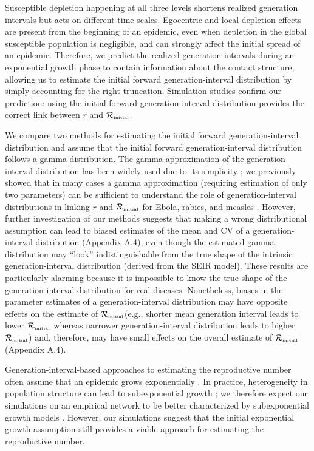 \documentclass[12pt]{article}
\newcommand{\Rx}[1]{\ensuremath{{\mathcal R}_{#1}}\xspace}
\newcommand{\Rini}{\Rx{\textrm{\tiny initial}}}
\begin{document}
Susceptible depletion happening at all three levels shortens realized generation intervals but acts on different time scales.
Egocentric and local depletion effects are present from the beginning of an epidemic, even when depletion in the global susceptible population is negligible, and can strongly affect the initial spread of an epidemic.
Therefore, we predict the realized generation intervals during an exponential growth phase to contain information about the contact structure, allowing us to estimate the initial forward generation-interval distribution by simply accounting for the right truncation.
Simulation studies confirm our prediction: using the initial forward generation-interval distribution provides the correct link between $r$ and $\Rini$.

We compare two methods for estimating the initial forward generation-interval distribution and assume that the initial forward generation-interval distribution follows a gamma distribution.
The gamma approximation of the generation interval distribution has been widely used due to its simplicity \citep{mcbryde2009early, nishiura2009transmission, roberts2011early, trichereau2012estimation, nishiura2015theoretical};
we previously showed that in many cases a gamma approximation (requiring estimation of only two parameters) can be sufficient to understand the role of generation-interval distributions in linking $r$ and $\Rini$ for Ebola, rabies, and measles \citep{park2019practical}.
However, further investigation of our methods suggests that making a wrong distributional assumption can lead to biased estimates of the mean and CV of a generation-interval distribution (Appendix A.4), even though the estimated gamma distribution may ``look'' indistinguishable from the true shape of the intrinsic generation-interval distribution (derived from the SEIR model).
These results are particularly alarming because it is impossible to know the true shape of the generation-interval distribution for real diseases.
Nonetheless, biases in the parameter estimates of a generation-interval distribution may have opposite effects on the estimate of \Rini (e.g., shorter mean generation interval leads to lower \Rini whereas narrower generation-interval distribution leads to higher \Rini) and, therefore, may have small effects on the overall estimate of $\Rini$ (Appendix A.4).

Generation-interval-based approaches to estimating the reproductive number often assume that an epidemic grows exponentially \citep{wearing2005appropriate, wallinga2007generation, roberts2007model, park2019practical}.
In practice, heterogeneity in population structure can lead to subexponential growth \citep{szendroi2004polynomial, chowell2015western, chowell2016growing, chowell2016characterizing, kiskowski2016modeling, viboud2016generalized};
we therefore expect our simulations on an empirical network to be better characterized by subexponential growth models \citep{viboud2016generalized}.
However, our simulations suggest that the initial exponential growth assumption still provides a viable approach for estimating the reproductive number.
\end{document}
